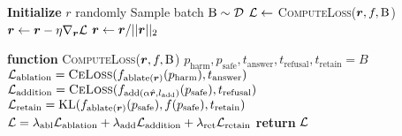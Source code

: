 \begin{algorithmic}[1]
\STATE \textbf{Initialize} $r$ randomly
\STATE Sample batch $\text{B} \sim \mathcal{D}$
\STATE ${\mathcal{L}} \leftarrow$ \textsc{ComputeLoss(${{\bm{r}}}, f, \text{B}$)}
\STATE ${{\bm{r}}} \leftarrow {{\bm{r}}} - \eta \nabla_{{{\bm{r}}}}{\mathcal{L}}$
\STATE ${{\bm{r}}} \leftarrow {{\bm{r}}}/||{{\bm{r}}}||_2$
\ENDWHILE
\end{algorithmic}
\vspace{1em}
\begin{algorithmic}[1]
\STATE \textbf{function} \textsc{ComputeLoss}(${{\bm{r}}}, f, \text{B}$)
\STATE \hspace*{1em} $p_{\text{harm}}, p_{\text{safe}}, t_{\text{answer}}, t_{\text{refusal}}, t_{\text{retain}} = B$
\STATE \hspace*{1em} ${\mathcal{L}}_{\text{ablation}} = {\textsc{CeLoss}}(f_{\text{ablate}({{\bm{r}}})}({{p}_{\text{harm}}}), {t_{\text{answer}}})$
\STATE \hspace*{1em} ${\mathcal{L}}_{\text{addition}} = {\textsc{CeLoss}}(f_{\text{add}(\alpha\hat{{{\bm{r}}}}, l_{\textnormal{add}})}({{p}_{\text{safe}}}), {t_{\text{refusal}}})$
\STATE \hspace*{1em} ${\mathcal{L}}_{\text{retain}} = {\text{KL}}(f_{\text{ablate}({{\bm{r}}})}({{p}_{\text{safe}}}), f({{p}_{\text{safe}}}), {t_{\text{retain}}})$
\STATE \hspace*{1em} ${\mathcal{L}} = \lambda_{\text{abl}} {\mathcal{L}}_{\text{ablation}} + \lambda_{\text{add}}{\mathcal{L}}_{\text{addition}} + \lambda_{\text{ret}}{\mathcal{L}}_{\text{retain}}$
\STATE \hspace*{1em} \textbf{return} ${\mathcal{L}}$\
\end{algorithmic}
